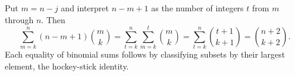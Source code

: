 Put $ m=n-j $ and interpret $ n-m+1 $ as the number of integers $ t $ from $ m $ through $ n $. Then \[\sum_{m=k}^n(n-m+1)\binom mk=\sum_{t=k}^n\sum_{m=k}^t\binom mk=\sum_{t=k}^n\binom{t+1}{k+1}=\binom{n+2}{k+2}.\]Each equality of binomial sums follows by classifying subsets by their largest element, the hockey-stick identity.
